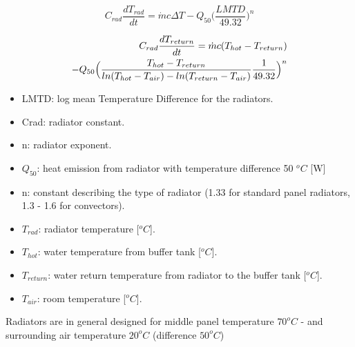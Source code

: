 \documentclass[a4paper,10pt]{article}
\begin{document}
\begin{equation}
C_{rad}\frac{dT_{rad}}{dt} = \Dot{m}c\Delta T - Q_{50}\Big(\frac{LMTD}{49.32}\Big)^n
\end{equation}


\begin{align}
C_{rad}\frac{dT_{return}}{dt} = \Dot{m}c(T_{hot}-T_{return})\notag\\
- Q_{50}\Big(\frac{T_{hot}-T_{return}}{ln(T_{hot}-T_{air}) - ln(T_{return}-T_{air})}\frac{1}{49.32}\Big)^n
\end{align}






\begin{itemize}
    \item LMTD: log mean Temperature Difference for the radiators.
    \item Crad: radiator constant.
    \item n: radiator exponent.
    \item $Q_{50}$: heat emission from radiator with temperature difference 50 $^oC$ [W]
    \item n: constant describing the type of radiator (1.33 for standard panel radiators, 1.3 - 1.6 for convectors). 
    \item $T_{rad}$: radiator temperature [$^oC$].
    \item $T_{hot}$: water temperature from buffer tank [$^oC$]. 
    \item $T_{return}$: water return temperature from radiator to the buffer tank [$^oC$].
    \item $T_{air}$: room temperature [$^oC$]. 
\end{itemize}
 Radiators are in general designed for middle panel temperature $70^oC$ - and surrounding air temperature $20^oC$ (difference $50^oC$)
\end{document}
